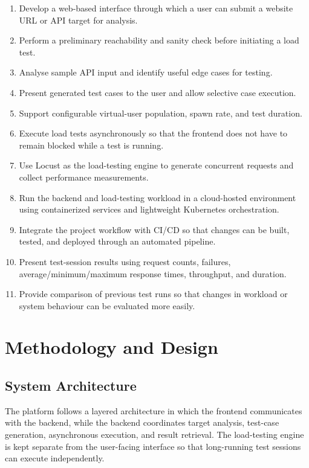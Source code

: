 \documentclass{tietreport}
\begin{document}
\begin{enumerate}
    \item Develop a web-based interface through which a user can submit a website URL or API target for analysis.
    \item Perform a preliminary reachability and sanity check before initiating a load test.
    \item Analyse sample API input and identify useful edge cases for testing.
    \item Present generated test cases to the user and allow selective case execution.
    \item Support configurable virtual-user population, spawn rate, and test duration.
    \item Execute load tests asynchronously so that the frontend does not have to remain blocked while a test is running.
    \item Use Locust as the load-testing engine to generate concurrent requests and collect performance measurements.
    \item Run the backend and load-testing workload in a cloud-hosted environment using containerized services and lightweight Kubernetes orchestration.
    \item Integrate the project workflow with CI/CD so that changes can be built, tested, and deployed through an automated pipeline.
    \item Present test-session results using request counts, failures, average/minimum/maximum response times, throughput, and duration.
    \item Provide comparison of previous test runs so that changes in workload or system behaviour can be evaluated more easily.
\end{enumerate}


\chapter{Methodology and Design}

\section{System Architecture}

The platform follows a layered architecture in which the frontend communicates with the backend, while the backend coordinates target analysis, test-case generation, asynchronous execution, and result retrieval. The load-testing engine is kept separate from the user-facing interface so that long-running test sessions can execute independently.
\end{document}
